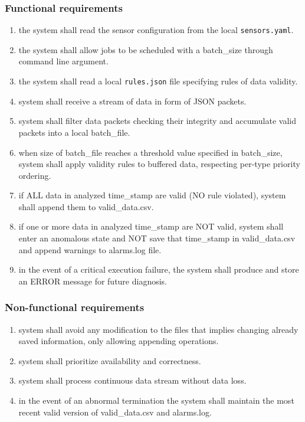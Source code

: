 \documentclass[11pt, a4paper]{article}
\begin{document}
\subsubsection{Functional requirements}
\begin{enumerate}[label=\textbf{FR-\arabic*:}, align=left, leftmargin=2cm]
    \item the system shall read the sensor configuration from the local \texttt{sensors.yaml}.
    \item the system shall allow jobs to be scheduled with a batch\_size through command line argument.
    \item the system shall read a local \texttt{rules.json} file specifying rules of data validity.
    \item system shall receive a stream of data in form of JSON packets.
    \item system shall filter data packets checking their integrity and accumulate valid packets into a local batch\_file.
    \item when size of batch\_file reaches a threshold value specified in batch\_size, system shall apply validity rules to buffered data, respecting per-type priority ordering.
    \item if ALL data in analyzed time\_stamp are valid (NO rule violated), system shall append them to valid\_data.csv.
    \item if one or more data in analyzed time\_stamp are NOT valid, system shall enter an anomalous state and NOT save that time\_stamp in valid\_data.csv and append warnings to alarms.log file.
    \item in the event of a critical execution failure, the system shall produce and store an ERROR message for future diagnosis.
\end{enumerate}
\subsubsection{Non-functional requirements}
\begin{enumerate}[label=\textbf{NFR-\arabic*:}, align=left, leftmargin=2cm]
    \item system shall avoid any modification to the files that implies changing already saved information, only allowing appending operations.
    \item system shall prioritize availability and correctness.
    \item system shall process continuous data stream without data loss.
    \item in the event of an abnormal termination the system shall maintain the most recent valid version of valid\_data.csv and alarms.log.
\end{enumerate}
\end{document}
